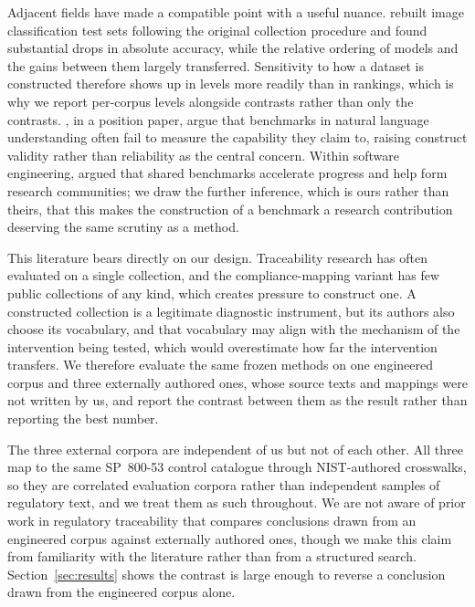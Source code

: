 \documentclass[a4paper,fleqn]{cas-sc}
\begin{document}
Adjacent fields have made a compatible point with a useful nuance.
\citet{Recht2019} rebuilt image classification test sets following the original collection procedure and found substantial drops in absolute accuracy, while the relative ordering of models and the gains between them largely transferred.
Sensitivity to how a dataset is constructed therefore shows up in levels more readily than in rankings, which is why we report per-corpus levels alongside contrasts rather than only the contrasts.
\citet{BowmanDahl2021}, in a position paper, argue that benchmarks in natural language understanding often fail to measure the capability they claim to, raising construct validity rather than reliability as the central concern.
Within software engineering, \citet{Sim2003} argued that shared benchmarks accelerate progress and help form research communities; we draw the further inference, which is ours rather than theirs, that this makes the construction of a benchmark a research contribution deserving the same scrutiny as a method.

This literature bears directly on our design.
Traceability research has often evaluated on a single collection, and the compliance-mapping variant has few public collections of any kind, which creates pressure to construct one.
A constructed collection is a legitimate diagnostic instrument, but its authors also choose its vocabulary, and that vocabulary may align with the mechanism of the intervention being tested, which would overestimate how far the intervention transfers.
We therefore evaluate the same frozen methods on one engineered corpus and three externally authored ones, whose source texts and mappings were not written by us, and report the contrast between them as the result rather than reporting the best number.

The three external corpora are independent of us but not of each other.
All three map to the same SP~800-53 control catalogue through NIST-authored crosswalks, so they are correlated evaluation corpora rather than independent samples of regulatory text, and we treat them as such throughout.
We are not aware of prior work in regulatory traceability that compares conclusions drawn from an engineered corpus against externally authored ones, though we make this claim from familiarity with the literature rather than from a structured search.
Section~\ref{sec:results} shows the contrast is large enough to reverse a conclusion drawn from the engineered corpus alone.


\end{document}

